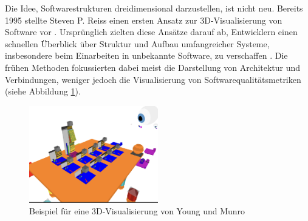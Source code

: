 Die Idee, Softwarestrukturen dreidimensional darzustellen, ist nicht neu. Bereits 1995 stellte Steven P. Reiss einen ersten Ansatz zur 3D-Visualisierung von Software vor \cite{first_3D_vis}. Ursprünglich zielten diese Ansätze darauf ab, Entwicklern einen schnellen Überblick über Struktur und Aufbau umfangreicher Systeme, insbesondere beim Einarbeiten in unbekannte Software, zu verschaffen \cite{visSoftwareVR}. Die frühen Methoden fokussierten dabei meist die Darstellung von Architektur und Verbindungen, weniger jedoch die Visualisierung von Softwarequalitätsmetriken (siehe Abbildung \ref{fig:3DVis}).

\begin{figure}[h]
    \centering
    \includegraphics[width=0.5\textwidth]{images/visVRExample.png}
    \caption{Beispiel für eine 3D-Visualisierung von Young und Munro \cite[6]{visSoftwareVR}}
    \label{fig:3DVis}
\end{figure}

